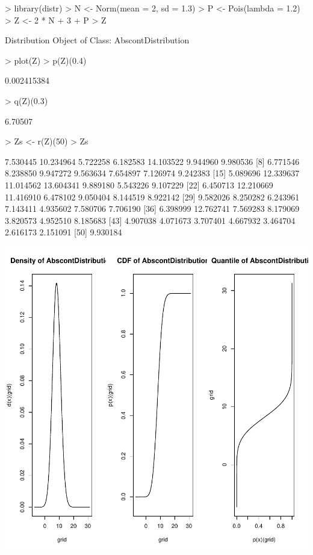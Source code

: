 \documentclass[11pt]{article}
\begin{document}
\begin{Schunk}
\begin{Sinput}
> library(distr)
> N <- Norm(mean = 2, sd = 1.3)
> P <- Pois(lambda = 1.2)
> Z <- 2 * N + 3 + P
> Z
\end{Sinput}
\begin{Soutput}
Distribution Object of Class: AbscontDistribution
\end{Soutput}
\begin{Sinput}
> plot(Z)
> p(Z)(0.4)
\end{Sinput}
\begin{Soutput}
[1] 0.002415384
\end{Soutput}
\begin{Sinput}
> q(Z)(0.3)
\end{Sinput}
\begin{Soutput}
[1] 6.70507
\end{Soutput}
\begin{Sinput}
> Zs <- r(Z)(50)
> Zs
\end{Sinput}
\begin{Soutput}
 [1]  7.530445 10.234964  5.722258  6.182583 14.103522  9.944960  9.980536
 [8]  6.771546  8.238850  9.947272  9.563634  7.654897  7.126974  9.242383
[15]  5.089696 12.339637 11.014562 13.604341  9.889180  5.543226  9.107229
[22]  6.450713 12.210669 11.416910  6.478102  9.050404  8.144519  8.922142
[29]  9.582026  8.250282  6.243961  7.143411  4.935602  7.580706  7.706190
[36]  6.398999 12.762741  7.569283  8.179069  3.820573  4.952510  8.185683
[43]  4.907038  4.071673  3.707401  4.667932  3.464704  2.616173  2.151091
[50]  9.930184
\end{Soutput}
\end{Schunk}
\includegraphics{distr-exam1}
\end{document}
